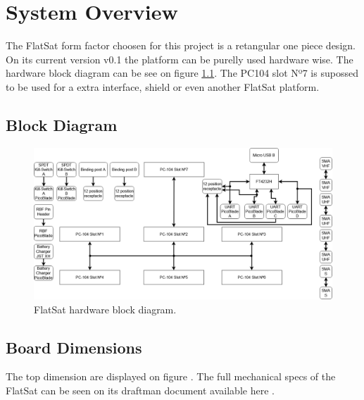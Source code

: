 %
%
%
%
%

%
%
%
%
%
%

\chapter{System Overview} \label{ch:system-overview}

The FlatSat form factor choosen for this project is a retangular one piece design. On its current version v0.1 the platform can be purelly used hardware wise. The hardware block diagram can be see on figure \ref{fig:block-diagram}. The PC104 slot Nº7 is supossed to be used for a extra interface, shield or even another FlatSat platform.

\section{Block Diagram}

\begin{figure}[!ht]
    \begin{center}
        \includegraphics[width=\textwidth]{figures/flatsat_block_diagram.png}
        \caption{FlatSat hardware block diagram.}
        \label{fig:block-diagram}
    \end{center}
\end{figure}

\section{Board Dimensions}

The top dimension are displayed on figure \cite{fig:top-dimensions}. The full mechanical specs of the FlatSat can be seen on its draftman document available here \cite{flatsat-draftsman}.